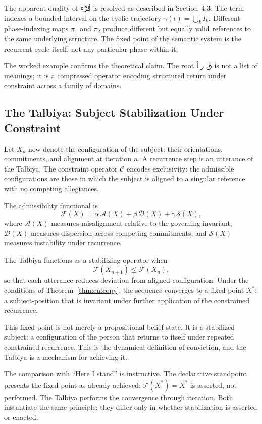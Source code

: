 \documentclass[12pt, oneside]{article}
\newcommand{\AR}[1]{\textarabic{#1}}
\theoremstyle{definition}
\theoremstyle{remark}
\begin{document}
The apparent duality of \AR{قُرْء} is resolved as described in Section~4.3.
The term indexes a bounded interval on the cyclic trajectory $\gamma(t) = \bigcup_{k} I_{k}$.
Different phase-indexing maps $\pi_{1}$ and $\pi_{2}$ produce different but equally valid references to the same underlying structure.
The fixed point of the semantic system is the recurrent cycle itself, not any particular phase within it.

The worked example confirms the theoretical claim.
The root \AR{ق ر أ} is not a list of meanings; it is a compressed operator encoding structured return under constraint across a family of domains.

\subsection{The Talbiya: Subject Stabilization Under Constraint}

Let $X_{n}$ now denote the configuration of the subject: their orientations, commitments, and alignment at iteration $n$.
A recurrence step is an utterance of the Talbiya.
The constraint operator $\mathcal{C}$ encodes exclusivity: the admissible configurations are those in which the subject is aligned to a singular reference with no competing allegiances.

The admissibility functional is
\[
\mathcal{F}(X) = \alpha\, \mathcal{A}(X) + \beta\, \mathcal{D}(X) + \gamma\, \mathcal{S}(X),
\]
where $\mathcal{A}(X)$ measures misalignment relative to the governing invariant, $\mathcal{D}(X)$ measures dispersion across competing commitments, and $\mathcal{S}(X)$ measures instability under recurrence.

The Talbiya functions as a stabilizing operator when
\[
\mathcal{F}(X_{n+1}) \leq \mathcal{F}(X_{n}),
\]
so that each utterance reduces deviation from aligned configuration.
Under the conditions of Theorem~\ref{thm:entropy}, the sequence converges to a fixed point $X^{*}$: a subject-position that is invariant under further application of the constrained recurrence.

This fixed point is not merely a propositional belief-state.
It is a stabilized subject: a configuration of the person that returns to itself under repeated constrained recurrence.
This is the dynamical definition of conviction, and the Talbiya is a mechanism for achieving it.

The comparison with ``Here I stand'' is instructive.
The declarative standpoint presents the fixed point as already achieved: $\mathcal{T}(X^{*}) = X^{*}$ is asserted, not performed.
The Talbiya performs the convergence through iteration.
Both instantiate the same principle; they differ only in whether stabilization is asserted or enacted.
\end{document}
